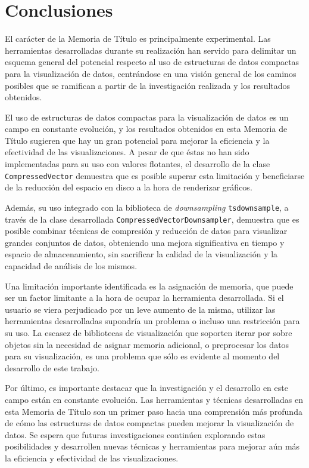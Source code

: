 \section{Conclusiones}

El carácter de la Memoria de Título es principalmente experimental. Las herramientas desarrolladas durante su realización han servido para delimitar un esquema general del potencial respecto al uso de estructuras de datos compactas para la visualización de datos, centrándose en una visión general de los caminos posibles que se ramifican a partir de la investigación realizada y los resultados obtenidos.

El uso de estructuras de datos compactas para la visualización de datos es un campo en constante evolución, y los resultados obtenidos en esta Memoria de Título sugieren que hay un gran potencial para mejorar la eficiencia y la efectividad de las visualizaciones. A pesar de que éstas no han sido implementadas para su uso con valores flotantes, el desarrollo de la clase \texttt{CompressedVector} demuestra que es posible superar esta limitación y beneficiarse de la reducción del espacio en disco a la hora de renderizar gráficos.

Además, su uso integrado con la biblioteca de \textit{downsampling} \texttt{tsdownsample}, a través de la clase desarrollada \texttt{CompressedVectorDownsampler}, demuestra que es posible combinar técnicas de compresión y reducción de datos para visualizar grandes conjuntos de datos, obteniendo una mejora significativa en tiempo y espacio de almacenamiento, sin sacrificar la calidad de la visualización y la capacidad de análisis de los mismos.

Una limitación importante identificada es la asignación de memoria, que puede ser un factor limitante a la hora de ocupar la herramienta desarrollada. Si el usuario se viera perjudicado por un leve aumento de la misma, utilizar las herramientas desarrolladas supondría un problema o incluso una restricción para su uso.
La escasez de bibliotecas de visualización que soporten iterar por sobre objetos sin la necesidad de asignar memoria adicional, o preprocesar los datos para su visualización, es una problema que sólo es evidente al momento del desarrollo de este trabajo.

Por último, es importante destacar que la investigación y el desarrollo en este campo están en constante evolución. Las herramientas y técnicas desarrolladas en esta Memoria de Título son un primer paso hacia una comprensión más profunda de cómo las estructuras de datos compactas pueden mejorar la visualización de datos. Se espera que futuras investigaciones continúen explorando estas posibilidades y desarrollen nuevas técnicas y herramientas para mejorar aún más la eficiencia y efectividad de las visualizaciones.

